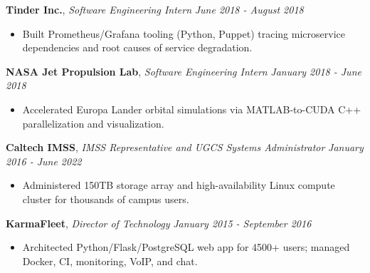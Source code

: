 \documentclass[8pt]{article}
\newenvironment{changemargin}[2]{%
  \begin{list}{}{%
    \setlength{\topsep}{0pt}%
    \setlength{\leftmargin}{#1}%
    \setlength{\rightmargin}{#2}%
    \setlength{\listparindent}{\parindent}%
    \setlength{\itemindent}{\parindent}%
    \setlength{\parsep}{0pt}%
    \setlength{\itemsep}{-2pt}%
  }%
  \item[]}{\end{list}
}
\newenvironment{body} {
	\vspace*{-10pt}
	\begin{changemargin}{-0.25in}{-0.5in}
  }	
	{\end{changemargin}
}
\begin{document}
\begin{body}
	\textbf{Tinder Inc.}, \emph{Software Engineering Intern} \hfill \emph{June 2018 - August 2018}\\
	\vspace*{-5pt}
	\begin{itemize} \itemsep -2pt
		\item Built Prometheus/Grafana tooling (Python, Puppet) tracing microservice dependencies and root causes of service degradation.
	\end{itemize}
	\vspace*{-6pt}

	\textbf{NASA Jet Propulsion Lab}, \emph{Software Engineering Intern} \hfill \emph{January 2018 - June 2018}\\
	\vspace*{-5pt}
	\begin{itemize} \itemsep -2pt
		\item Accelerated Europa Lander orbital simulations via MATLAB-to-CUDA C++ parallelization and visualization.
	\end{itemize}
	\vspace*{-6pt}

	\textbf{Caltech IMSS}, \emph{IMSS Representative and UGCS Systems Administrator} \hfill \emph{January 2016 - June 2022}\\
	\vspace*{-6pt}
	\begin{itemize} \itemsep -2pt
		\item Administered 150TB storage array and high-availability Linux compute cluster for thousands of campus users.
	\end{itemize}
	\vspace*{-6pt}

	\textbf{KarmaFleet}, \emph{Director of Technology} \hfill \emph{January 2015 - September 2016}\\
	\vspace*{-6pt}
	\begin{itemize} \itemsep -2pt
		\item Architected Python/Flask/PostgreSQL web app for 4500+ users; managed Docker, CI, monitoring, VoIP, and chat.
	\end{itemize}
	\vspace*{-6pt}

\end{body}

\vspace*{-6pt}
\end{document}
